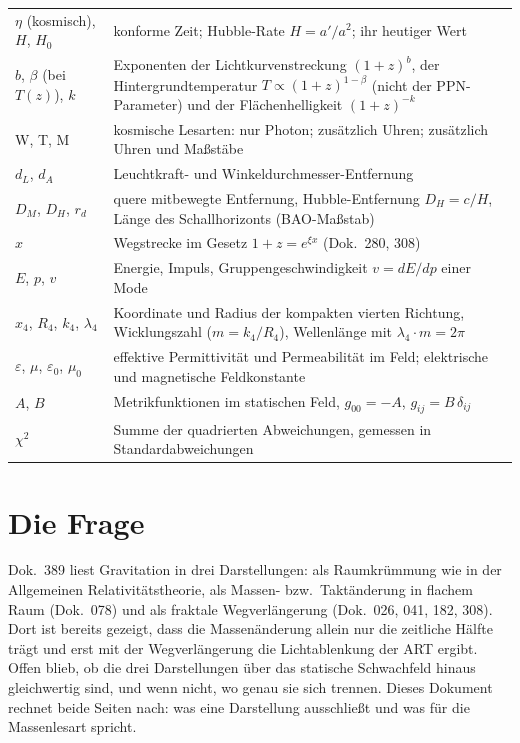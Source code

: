 \begin{center}
\begin{tabular}{@{}p{3.3cm}p{11.2cm}@{}}
$\eta$ (kosmisch), $H$, $H_0$ & konforme Zeit; Hubble-Rate $H=a'/a^2$; ihr heutiger Wert \\
$b$, $\beta$ (bei $T(z)$), $k$ & Exponenten der Lichtkurvenstreckung $(1+z)^b$, der
Hintergrundtemperatur $T\propto(1+z)^{1-\beta}$ (nicht der PPN-Parameter) und der
Flächenhelligkeit $(1+z)^{-k}$ \\
W, T, M & kosmische Lesarten: nur Photon; zusätzlich Uhren; zusätzlich Uhren und Maßstäbe \\
$d_L$, $d_A$ & Leuchtkraft- und Winkeldurchmesser-Entfernung \\
$D_M$, $D_H$, $r_d$ & quere mitbewegte Entfernung, Hubble-Entfernung $D_H=c/H$, Länge des
Schallhorizonts (BAO-Maßstab) \\
$x$ & Wegstrecke im Gesetz $1+z=e^{\xi x}$ (Dok.~280, 308) \\
$E$, $p$, $v$ & Energie, Impuls, Gruppengeschwindigkeit $v=dE/dp$ einer Mode \\
$x_4$, $R_4$, $k_4$, $\lambda_4$ & Koordinate und Radius der kompakten vierten Richtung, Wicklungszahl
($m=k_4/R_4$), Wellenlänge mit $\lambda_4\cdot m=2\pi$ \\
$\varepsilon$, $\mu$, $\varepsilon_0$, $\mu_0$ & effektive Permittivität und Permeabilität im Feld;
elektrische und magnetische Feldkonstante \\
$A$, $B$ & Metrikfunktionen im statischen Feld, $g_{00}=-A$, $g_{ij}=B\,\delta_{ij}$ \\
$\chi^2$ & Summe der quadrierten Abweichungen, gemessen in Standardabweichungen \\
\bottomrule
\end{tabular}
\end{center}

\section{Die Frage}

Dok.~389 liest Gravitation in drei Darstellungen: als Raumkrümmung wie in der Allgemeinen
Relativitätstheorie, als Massen- bzw.\ Taktänderung in flachem Raum (Dok.~078) und als fraktale
Wegverlängerung (Dok.~026, 041, 182, 308). Dort ist bereits gezeigt, dass die Massenänderung allein nur
die zeitliche Hälfte trägt und erst mit der Wegverlängerung die Lichtablenkung der ART ergibt. Offen
blieb, ob die drei Darstellungen über das statische Schwachfeld hinaus gleichwertig sind, und wenn
nicht, wo genau sie sich trennen. Dieses Dokument rechnet beide Seiten nach: was eine Darstellung
ausschließt und was für die Massenlesart spricht.

